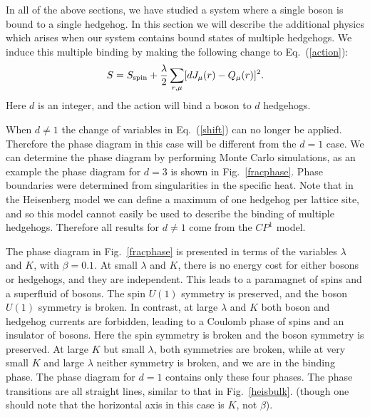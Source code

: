 \documentclass[prb,twocolumn]{revtex4-1}
\begin{document}
In all of the above sections, we have studied a system where a single boson is bound to a single hedgehog. In this section we will describe the additional physics which arises when our system contains bound states of multiple hedgehogs. We induce this multiple binding by making the following change to Eq.~(\ref{action}):
\begin{equation}
S=S_{\rm spin}+\frac{\lambda}{2}\sum_{r,\mu} [ dJ_\mu(r)- Q_\mu(r)]^2.
\label{cdbind}
\end{equation}
Here $d$ is an integer, and the action will bind a boson to $d$ hedgehogs. 

When $d\neq1$ the change of variables in Eq.~(\ref{shift}) can no longer be applied. Therefore the phase diagram in this case will be different from the $d=1$ case. We can determine the phase diagram by performing Monte Carlo simulations, as an example the phase diagram for $d=3$ is shown in Fig.~\ref{fracphase}. Phase boundaries were determined from singularities in the specific heat. Note that in the Heisenberg model we can define a maximum of one hedgehog per lattice site, and so this model cannot easily be used to describe the binding of  multiple hedgehogs. Therefore all results for $d \neq 1$ come from the $CP^1$ model. 

The phase diagram in Fig.~\ref{fracphase} is presented in terms of the variables $\lambda$ and $K$, with $\beta=0.1$. 
At small $\lambda$ and $K$, there is no energy cost for either bosons or hedgehogs, and they are independent. This leads to a paramagnet of spins and a superfluid of bosons. The spin $U(1)$ symmetry is preserved, and the boson $U(1)$ symmetry is broken. In contrast, at large $\lambda$ and $K$ both boson and hedgehog currents are forbidden, leading to a Coulomb phase of spins and an insulator of bosons. Here the spin symmetry is broken and the boson symmetry is preserved. At large $K$ but small $\lambda$, both symmetries are broken, while at very small $K$ and large $\lambda$ neither symmetry is broken, and we are in the binding phase. The phase diagram for $d=1$ contains only these four phases. The phase transitions are all straight lines,  similar to that in Fig.~\ref{heisbulk}. (though one should note that the horizontal axis in this case is $K$, not $\beta$). 
\end{document}
